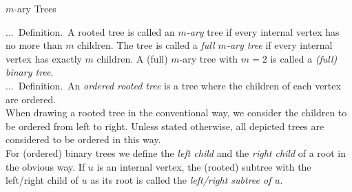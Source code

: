 \documentclass[smaller,hyperref={CJKbookmarks=true}]{beamer}
\newcounter{zhuo}[subsection]
\renewcommand{\thezhuo}{\thesection.\thesubsection.\arabic{zhuo}}
\newenvironment{DEFINITION}{\stepcounter{zhuo}\alert{\thezhuo.~Definition.\,}}{}
\begin{document}
\begin{frame}[c]{$m$-ary Trees}
\begin{spacing}{1.1}
\begin{DEFINITION}
A rooted tree is called an \emph{$m$-ary} tree if every internal
vertex has no more than $m$ children. The tree is called a \emph{full $m$-ary tree} if every internal vertex has exactly $m$ children. A (full) $m$-ary tree with $m = 2$ is called a \emph{(full) binary tree}.\\[6pt]
\end{DEFINITION}
\begin{DEFINITION}
An \emph{ordered rooted tree} is a tree where the children of each vertex are ordered.\\[6pt]
\end{DEFINITION}
When drawing a rooted tree in the conventional way, we consider the
children to be ordered from left to right. Unless stated otherwise, all
depicted trees are considered to be ordered in this way.\\[6pt]
For (ordered) binary trees we define the \emph{left child} and the \emph{right child} of a
root in the obvious way. If $u$ is an internal vertex, the (rooted) subtree
with the left/right child of $u$ as its root is called the \emph{left/right subtree of $u$}.
\end{spacing}
\end{frame}
\end{document}
